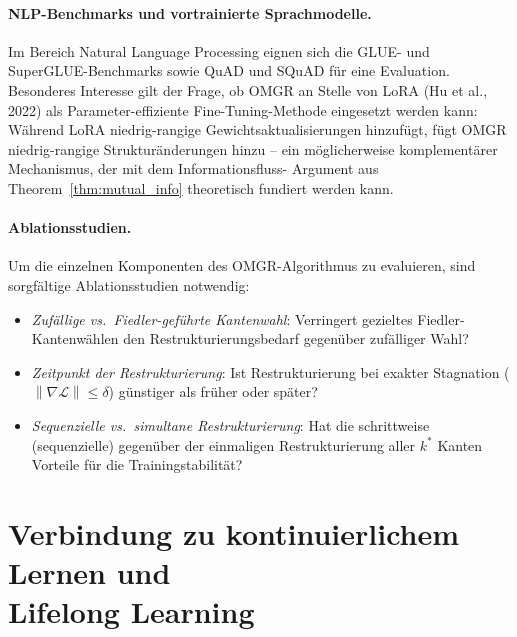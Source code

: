 \documentclass[12pt, a4paper, openany]{report}
\newcommand{\calL}{\mathcal{L}}
\newcommand{\norms}[1]{\left\|#1\right\|}
\begin{document}
\paragraph{NLP-Benchmarks und vortrainierte Sprachmodelle.}
Im Bereich Natural Language Processing eignen sich die GLUE- und
SuperGLUE-Benchmarks sowie QuAD und SQuAD für eine Evaluation.
Besonderes Interesse gilt der Frage, ob OMGR an Stelle von LoRA
(Hu et al., 2022) als Parameter-effiziente Fine-Tuning-Methode
eingesetzt werden kann: Während LoRA niedrig-rangige Gewichtsaktualisierungen
hinzufügt, fügt OMGR niedrig-rangige Strukturänderungen hinzu -- ein
möglicherweise komplementärer Mechanismus, der mit dem Informationsfluss-
Argument aus Theorem~\ref{thm:mutual_info} theoretisch fundiert werden kann.

\paragraph{Ablationsstudien.}
Um die einzelnen Komponenten des OMGR-Algorithmus zu evaluieren, sind
sorgfältige Ablationsstudien notwendig:
\begin{itemize}
  \item \emph{Zufällige vs.\ Fiedler-geführte Kantenwahl}: Verringert
    gezieltes Fiedler-Kantenwählen den Restrukturierungsbedarf gegenüber
    zufälliger Wahl?
  \item \emph{Zeitpunkt der Restrukturierung}: Ist Restrukturierung bei
    exakter Stagnation ($\norms{\nabla\calL} \leq \delta$) günstiger als
    früher oder später?
  \item \emph{Sequenzielle vs.\ simultane Restrukturierung}: Hat die
    schrittweise (sequenzielle) gegenüber der einmaligen Restrukturierung
    aller $k^*$ Kanten Vorteile für die Trainingstabilität?
\end{itemize}

\section{Verbindung zu kontinuierlichem Lernen und \\ Lifelong Learning}
\label{sec:outlook_continual}
\end{document}
